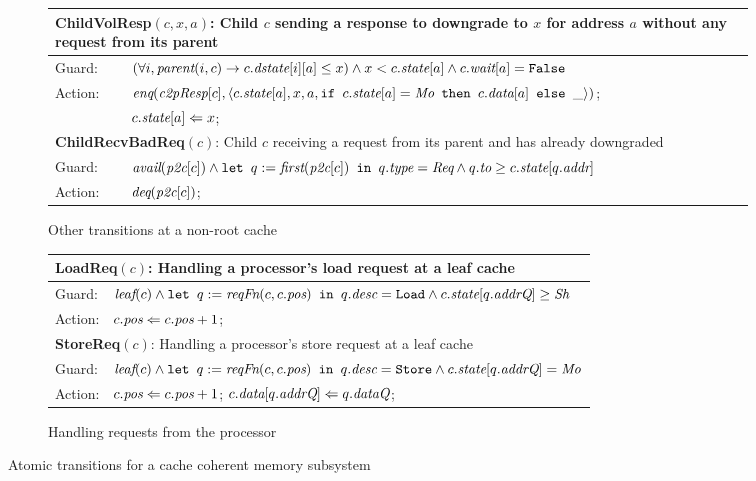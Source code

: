 \begin{figure}
\begin{subfigure}{\textwidth}
\centering
\begin{tabular}{|ll|}
\hline
\multicolumn{2}{|p{\textwidth}|}{\textbf{ChildVolResp}$(c, x, a)$: Child $c$ sending a response to downgrade to $x$ for address $a$ without any request from its parent}\\
\hline
Guard: & $(\forall i, \textit{parent}(i, c) \rightarrow c.\textit{dstate}[i][a] \le x) \wedge x < c.\textit{state}[a] \wedge c.\textit{wait}[a] = \texttt{False}$\\
\hline
Action: & $\enq(\cpResp[c], \langle c.\state[a], x, a,%
\myif c.\state[a] = \Mo \mythen c.\data[a] \myelse \_\rangle)$;\\
& $c.\textit{state}[a] \Leftarrow x$;\\
\hline
\hline
\multicolumn{2}{|p{\textwidth}|}{\textbf{ChildRecvBadReq}$(c)$: Child $c$ receiving a request from its parent and has already downgraded}\\
\hline
Guard: & 
$\textit{avail}(\textit{p2c}[c]) \wedge \texttt{let } q := \textit{first}(\textit{p2c}[c]) \texttt{ in } q.\textit{type} = \textit{Req} \wedge q.\textit{to} \ge c.\textit{state}[q.\textit{addr}]$\\
\hline
Action: & $\textit{deq}(\textit{p2c}[c])$;\\
\hline
\end{tabular}
\caption{Other transitions at a non-root cache}
\label{childextra}
\end{subfigure}

\begin{subfigure}{\textwidth}
\centering
\begin{tabular}{|ll|}
\hline
\multicolumn{2}{|l|}{\textbf{LoadReq}$(c)$: Handling a processor's load request at a leaf cache}\\
\hline
Guard: & $\textit{leaf}(c) \wedge \texttt{let } q := \textit{reqFn}(c, c.\textit{pos}) \texttt{ in } q.\textit{desc} = \texttt{Load} \wedge c.\textit{state}[q.\textit{addrQ}] \ge \textit{Sh}$\\
\hline
Action:& $c.\textit{pos} \Leftarrow c.\textit{pos} + 1$;\\
\hline
\hline
\multicolumn{2}{|l|}{\textbf{StoreReq}$(c)$: Handling a processor's store request at a leaf cache}\\
\hline
Guard: & $\textit{leaf}(c) \wedge \texttt{let } q := \textit{reqFn}(c, c.\textit{pos}) \texttt{ in } q.\textit{desc} = \texttt{Store} \wedge c.\textit{state}[q.\textit{addrQ}] = \textit{Mo}$\\
\hline
\hline
Action:& $c.\textit{pos} \Leftarrow c.\textit{pos} + 1$; $c.\textit{data}[q.\textit{addrQ}] \Leftarrow q.\textit{dataQ}$;\\
\hline
\end{tabular}
\caption{Handling requests from the processor}
\label{procside}
\end{subfigure}
\caption{Atomic transitions for a cache coherent memory subsystem}
\label{trans}
\end{figure}

